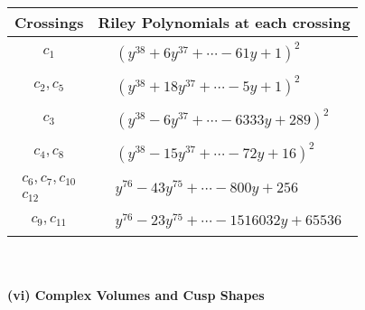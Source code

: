 \documentclass[1p]{elsarticle_modified}
\theoremstyle{definition}
\begin{document}
\begin{tabular}{m{50pt}|m{274pt}}
Crossings & \hspace{64pt}Riley Polynomials at each crossing \\
\hline $$\begin{aligned}c_{1}\end{aligned}$$&$\begin{aligned}
&(y^{38}+6 y^{37}+\cdots-61 y+1)^{2}
\end{aligned}$\\
\hline $$\begin{aligned}c_{2},c_{5}\end{aligned}$$&$\begin{aligned}
&(y^{38}+18 y^{37}+\cdots-5 y+1)^{2}
\end{aligned}$\\
\hline $$\begin{aligned}c_{3}\end{aligned}$$&$\begin{aligned}
&(y^{38}-6 y^{37}+\cdots-6333 y+289)^{2}
\end{aligned}$\\
\hline $$\begin{aligned}c_{4},c_{8}\end{aligned}$$&$\begin{aligned}
&(y^{38}-15 y^{37}+\cdots-72 y+16)^{2}
\end{aligned}$\\
\hline $$\begin{aligned}c_{6},c_{7},c_{10}\\c_{12}\end{aligned}$$&$\begin{aligned}
&y^{76}-43 y^{75}+\cdots-800 y+256
\end{aligned}$\\
\hline $$\begin{aligned}c_{9},c_{11}\end{aligned}$$&$\begin{aligned}
&y^{76}-23 y^{75}+\cdots-1516032 y+65536
\end{aligned}$\\
\hline
\end{tabular}\\~\\
\newpage\flushleft \textbf{(vi) Complex Volumes and Cusp Shapes}
\end{document}
